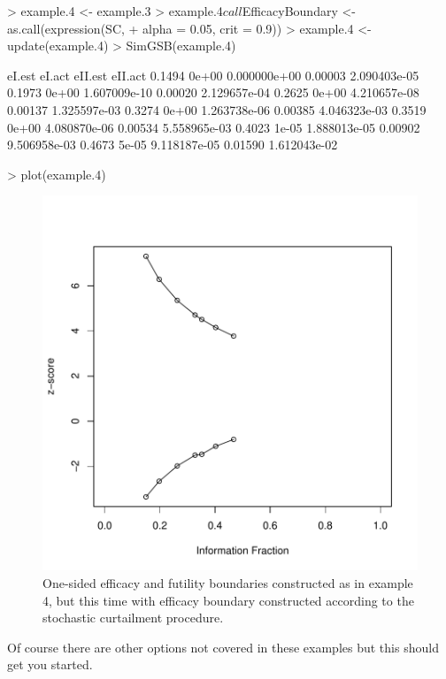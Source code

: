 \documentclass{article}
\begin{document}
\begin{itemize}
{\begin{Schunk}
\begin{Sinput}
> example.4 <- example.3
> example.4$call$EfficacyBoundary <- as.call(expression(SC, 
+     alpha = 0.05, crit = 0.9))
> example.4 <- update(example.4)
> SimGSB(example.4)
\end{Sinput}
\begin{Soutput}
       eI.est       eI.act eII.est      eII.act
0.1494  0e+00 0.000000e+00 0.00003 2.090403e-05
0.1973  0e+00 1.607009e-10 0.00020 2.129657e-04
0.2625  0e+00 4.210657e-08 0.00137 1.325597e-03
0.3274  0e+00 1.263738e-06 0.00385 4.046323e-03
0.3519  0e+00 4.080870e-06 0.00534 5.558965e-03
0.4023  1e-05 1.888013e-05 0.00902 9.506958e-03
0.4673  5e-05 9.118187e-05 0.01590 1.612043e-02
\end{Soutput}
\end{Schunk}

\begin{Schunk}
\begin{Sinput}
> plot(example.4)
\end{Sinput}
\end{Schunk}

  \begin{figure}
  \begin{center}
\includegraphics{GrpSeqBnds-vignette-1-incl-ex4-plot}
  \end{center}
  \caption{One-sided efficacy and futility boundaries constructed as in example 4, but this time 
    with efficacy boundary constructed according to the stochastic curtailment procedure.}
  \label{fig:ex4}
  \end{figure}
  
  Of course there are other options not covered in these examples but this should get you
    started.
  }
  \end{itemize}
\end{document}
